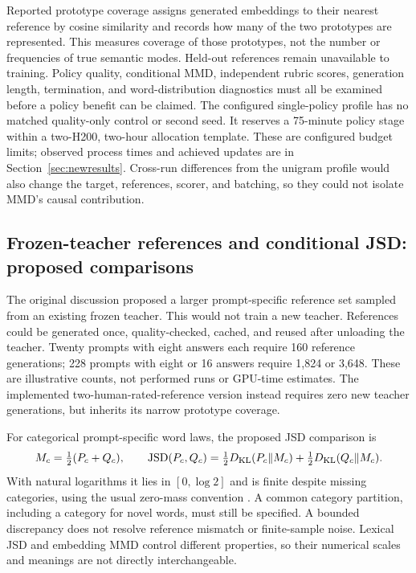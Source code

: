 Reported prototype coverage assigns generated embeddings to their nearest
reference by cosine similarity and records how many of the two prototypes
are represented. This measures coverage of those prototypes, not the
number or frequencies of true semantic modes. Held-out references remain
unavailable to training. Policy quality, conditional MMD, independent
rubric scores, generation length, termination, and word-distribution
diagnostics must all be examined before a policy benefit can be claimed.
The configured single-policy profile has no matched quality-only control
or second seed. It reserves a 75-minute policy stage within a two-H200,
two-hour allocation template. These are configured budget limits; observed
process times and achieved updates are in Section~\ref{sec:newresults}.
Cross-run differences from
the unigram profile would also change the target, references, scorer,
and batching, so they could not isolate MMD's causal contribution.

\subsection{Frozen-teacher references and conditional JSD: proposed comparisons}
The original discussion proposed a larger prompt-specific reference
set sampled from an existing frozen teacher. This would not train a
new teacher. References could be generated once, quality-checked,
cached, and reused after unloading the teacher. Twenty prompts with
eight answers each require 160 reference generations; 228 prompts
with eight or 16 answers require 1,824 or 3,648. These are illustrative
counts, not performed runs or GPU-time estimates. The implemented
two-human-rated-reference version instead requires zero new teacher
generations, but inherits its narrow prototype coverage.

For categorical prompt-specific word laws, the proposed JSD comparison is
\begin{equation}
 M_c=\tfrac12(P_c+Q_c),\qquad
 \operatorname{JSD}(P_c,Q_c)=
 \tfrac12D_{\mathrm{KL}}(P_c\Vert M_c)+\tfrac12D_{\mathrm{KL}}(Q_c\Vert M_c).
 \label{eq:conditionaljsd}
\end{equation}
With natural logarithms it lies in $[0,\log 2]$ and is finite despite
missing categories, using the usual zero-mass convention \cite{lin1991}.
A common category partition, including a category for novel words,
must still be specified. A bounded discrepancy does not resolve
reference mismatch or finite-sample noise. Lexical JSD and embedding
MMD control different properties, so their numerical scales and meanings
are not directly interchangeable.

